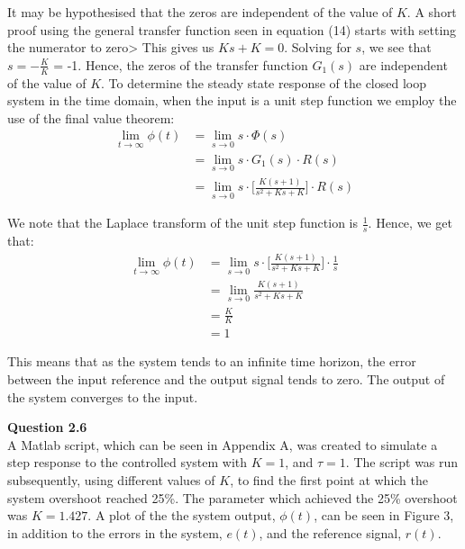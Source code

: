 \documentclass{article}
\begin{document}
	It may be hypothesised that the zeros are independent of the value of $K$. A short proof using the general transfer function seen in equation (14) starts with setting the numerator to zero> This gives us $Ks + K = 0$. Solving for $s$, we see that $s = -\frac{K}{K}$ = -1. Hence, the zeros of the transfer function $G_1(s)$ are independent of the value of $K$. To determine the steady state response of the closed loop system in the time domain, when the input is a unit step function we employ the use of the final value theorem:
	\begin{align*}
		\lim_{t \to \infty} \phi(t) 	& = \lim_{s \to 0} s \cdot \Phi(s)\\
										& = \lim_{s \to 0} s \cdot G_1(s) \cdot R(s)\\
										&= \lim_{s \to 0} s \cdot \bigg[ \frac{K(s + 1)}{s^2 + Ks +K}\bigg] \cdot R(s)
	\end{align*}
	
	We note that the Laplace transform of the unit step function is $\frac{1}{s}$. Hence, we get that:
	\begin{align*}
		\lim_{t \to \infty} \phi(t) &= \lim_{s \to 0} s \cdot \bigg[ \frac{K(s + 1)}{s^2 + Ks +K}\bigg] \cdot \frac{1}{s}\\
									&= \lim_{s \to 0} \frac{K(s + 1)}{s^2 + Ks +K}\\
									&= \frac{K}{K}\\
									&= 1
	\end{align*}
	
	This means that as the system tends to an infinite time horizon, the error between the input reference and the output signal tends to zero. The output of the system converges to the input.\\
	\newpage
	

	\textbf{Question 2.6}\\
	
	A Matlab script, which can be seen in Appendix A, was created to simulate a step response to the controlled system with $K = 1$, and $\tau = 1$. The script was run subsequently, using different values of $K$, to find the first point at which the system overshoot reached 25\%. The parameter which achieved the 25\% overshoot was $K = 1.427$. A plot of the the system output, $\phi(t)$, can be seen in Figure 3, in addition to the errors in the system, $e(t)$, and the reference signal, $r(t)$.
	
\end{document}
